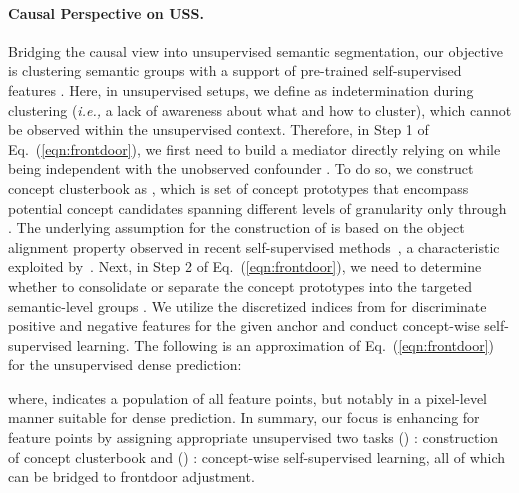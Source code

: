 \documentclass{article} \usepackage{iclr2024_conference,times}
\begin{document}
\paragraph{Causal Perspective on USS.} Bridging the causal view into unsupervised semantic segmentation, our objective is clustering semantic groups  with a support of pre-trained self-supervised features . Here, in unsupervised setups, we define  as indetermination during clustering (\textit{i.e.,} a lack of awareness about what and how to cluster), which cannot be observed within the unsupervised context. Therefore, in Step 1 of Eq.~(\ref{eqn:frontdoor}), we first need to build a mediator directly relying on  while being independent with the unobserved confounder . To do so, we construct concept clusterbook as , which is set of concept prototypes that encompass potential concept candidates spanning different levels of granularity only through . The underlying assumption for the construction of  is based on the object alignment property observed in recent self-supervised methods~\citep{caron2021emerging, oquab2023dinov2}, a characteristic exploited by~\citet{hamilton2022unsupervised, seong2023leveraging}. Next, in Step 2 of Eq.~(\ref{eqn:frontdoor}), we need to determine whether to consolidate or separate the concept prototypes into the targeted semantic-level groups . We utilize the discretized indices from  for discriminate positive and negative features for the given anchor and conduct concept-wise self-supervised learning. The following is an approximation of Eq.~(\ref{eqn:frontdoor}) for the unsupervised dense prediction:

where,  indicates a population of all feature points, but notably in a pixel-level manner suitable for dense prediction. In summary, our focus is enhancing  for feature points  by assigning appropriate unsupervised two tasks (\lowercase\expandafter{}) : construction of concept clusterbook and (\lowercase\expandafter{}) : concept-wise self-supervised learning, all of which can be bridged to frontdoor adjustment.
\end{document}
